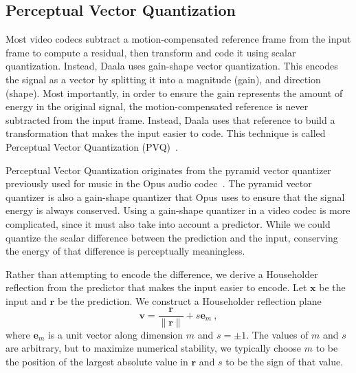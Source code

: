 \documentclass[english,conference,10pt]{IEEEtran}
\begin{document}
\subsection{Perceptual Vector Quantization}
\label{sec:PVQ}

Most video codecs subtract a motion-compensated reference frame
from the input frame to compute a residual, then transform and code it
using scalar quantization. Instead, Daala uses gain-shape vector quantization.
This encodes the signal as a vector by splitting it into a magnitude (gain),
and direction (shape). Most importantly, in order to ensure the gain represents
the amount of energy in the original signal, the motion-compensated
reference is never subtracted from the input frame. Instead, Daala uses that
reference to build a transformation that makes the input easier to code.
This technique is called Perceptual
Vector Quantization (PVQ)~\cite{valin2015spie}.

Perceptual Vector Quantization originates from the pyramid vector quantizer
previously used for music in the Opus audio codec~\cite{ValinAES}.
The pyramid vector quantizer is also a gain-shape quantizer that Opus uses to
ensure that the signal energy is always conserved. Using a gain-shape
quantizer in a video codec is more complicated, since it must also take
into account a predictor. While we could quantize the scalar difference
between the prediction and the input, conserving the energy of that
difference is perceptually meaningless.

Rather than attempting to encode the difference, we derive a Householder
reflection from the predictor that makes the input easier to encode. Let
$\mathbf{x}$ be the input and $\mathbf{r}$ be the prediction.
We construct a Householder reflection plane
\begin{equation}
\mathbf{v} = \frac{\mathbf{r}}{\|\mathbf{r}\|} + s\mathbf{e}_m\ ,
\end{equation}
where $\mathbf{e}_m$ is a unit vector along dimension $m$ and $s = \pm1$.
The values of $m$ and $s$ are arbitrary, but to maximize
numerical stability, we typically choose $m$ to be the position of the
largest absolute value in $\mathbf{r}$ and $s$ to be the sign of that value.
\end{document}
